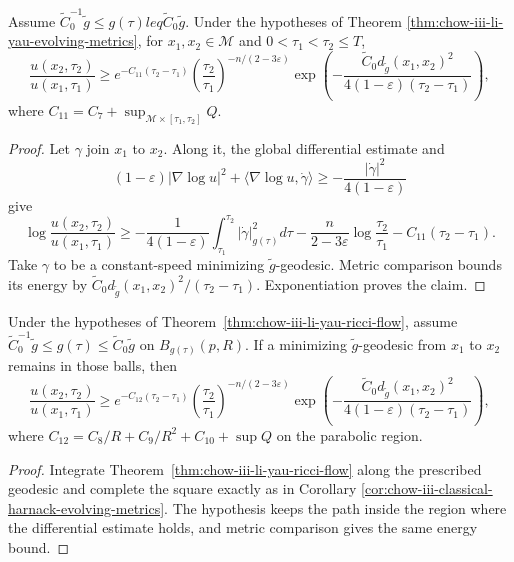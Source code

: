 \begin{corollary}
\label{cor:chow-iii-classical-harnack-evolving-metrics}


Assume \(\widetilde C_0^{-1}\widetilde g\leq g(\tau)leq
\widetilde C_0\widetilde g\).  Under the hypotheses of Theorem
\ref{thm:chow-iii-li-yau-evolving-metrics}, for
\(x_1,x_2\in\mathcal M\) and \(0<\tau_1<\tau_2\leq T\),
\[
 \frac{u(x_2,\tau_2)}{u(x_1,\tau_1)}
 \geq e^{-C_{11}(\tau_2-\tau_1)}
 \left(\frac{\tau_2}{\tau_1}\right)^{-n/(2-3\varepsilon)}
 \exp\left(-\frac{\widetilde C_0d_{\widetilde g}(x_1,x_2)^2}
 {4(1-\varepsilon)(\tau_2-\tau_1)}\right),
\]
where \(C_{11}=C_7+\sup_{\mathcal M\times[\tau_1,\tau_2]}Q\).
\end{corollary}
\begin{proof}
\sketch Let \(\gamma\) join \(x_1\) to \(x_2\).  Along it, the global differential
estimate and
\[
 (1-\varepsilon)|\nabla\log u|^2
 +\langle\nabla\log u,\dot\gamma\rangle
 \geq-\frac{|\dot\gamma|^2}{4(1-\varepsilon)}
\]
give
\[
 \log\frac{u(x_2,\tau_2)}{u(x_1,\tau_1)}
 \geq-\frac1{4(1-\varepsilon)}\int_{\tau_1}^{\tau_2}|\dot\gamma|_{g(\tau)}^2d\tau
 -\frac n{2-3\varepsilon}\log\frac{\tau_2}{\tau_1}
 -C_{11}(\tau_2-\tau_1).
\]
Take \(\gamma\) to be a constant-speed minimizing \(\widetilde g\)-geodesic.
Metric comparison bounds its energy by
\(\widetilde C_0d_{\widetilde g}(x_1,x_2)^2/(\tau_2-\tau_1)\).
Exponentiation proves the claim.
\end{proof}

\begin{corollary}
\label{cor:chow-iii-classical-harnack-ricci-flow}


Under the hypotheses of Theorem~\ref{thm:chow-iii-li-yau-ricci-flow}, assume
\(\widetilde C_0^{-1}\widetilde g\leq g(\tau)\leq
\widetilde C_0\widetilde g\) on \(B_{g(\tau)}(p,R)\).  If a minimizing
\(\widetilde g\)-geodesic from \(x_1\) to \(x_2\) remains in those balls,
then
\[
 \frac{u(x_2,\tau_2)}{u(x_1,\tau_1)}
 \geq e^{-C_{12}(\tau_2-\tau_1)}
 \left(\frac{\tau_2}{\tau_1}\right)^{-n/(2-3\varepsilon)}
 \exp\left(-\frac{\widetilde C_0d_{\widetilde g}(x_1,x_2)^2}
 {4(1-\varepsilon)(\tau_2-\tau_1)}\right),
\]
where
\(C_{12}=C_8/R+C_9/R^2+C_{10}+\sup Q\) on the parabolic region.
\end{corollary}
\begin{proof}
\sketch Integrate Theorem~\ref{thm:chow-iii-li-yau-ricci-flow} along the prescribed
geodesic and complete the square exactly as in Corollary
\ref{cor:chow-iii-classical-harnack-evolving-metrics}.  The hypothesis keeps
the path inside the region where the differential estimate holds, and metric
comparison gives the same energy bound.
\end{proof}

